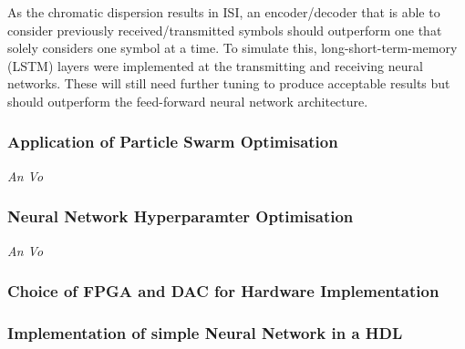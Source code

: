     As the chromatic dispersion results in ISI, an encoder/decoder that is able to consider previously received/transmitted symbols should outperform one that solely considers one symbol at a time. To simulate this, long-short-term-memory (LSTM) layers were implemented at the transmitting and receiving neural networks. These will still need further tuning to produce acceptable results but should outperform the feed-forward neural network architecture.
    
    \subsubsection{Application of Particle Swarm Optimisation} \hspace*{0pt}\hfill \textit{An Vo}\\
    \subsubsection{Neural Network Hyperparamter Optimisation} \hspace*{0pt}\hfill \textit{An Vo}\\
    
    \subsubsection{Choice of FPGA and DAC for Hardware Implementation}
    
    \subsubsection{Implementation of simple Neural Network in a HDL}